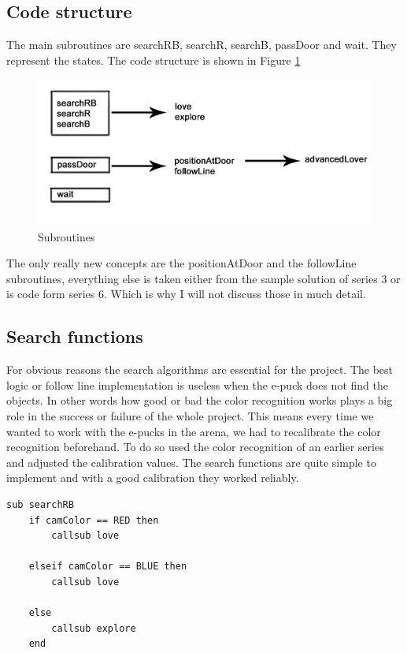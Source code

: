 \documentclass[12pt,a4paper]{article}
\begin{document}
\subsection{Code structure}
The main subroutines are searchRB, searchR, searchB, passDoor and wait. They represent the states. The code structure is shown in Figure \ref{fig:Subroutines}
\begin{figure}[h!]
\begin{center}
\includegraphics[scale=3]{images/SubroutinesOverview.png}
\caption{Subroutines}
\label{fig:Subroutines}	
\end{center}
\end{figure}
The only really new concepts are the positionAtDoor and the followLine subroutines, everything else is taken either from the sample solution of series 3 or is code form series 6. Which is why I will not discuss those in much detail. 

\subsection{Search functions}
For obvious reasons the search algorithms are essential for the project. The best logic or follow line implementation is useless when the e-puck does not find the objects. In other words how good or bad the color recognition works plays a big role in the success or failure of the whole project. This means every time we wanted to work with the e-pucks in the arena, we had to recalibrate the color recognition beforehand. To do so used the color recognition of an earlier series and adjusted the calibration values. The search functions are quite simple to implement and with a good calibration they worked reliably.
\begin{lstlisting}
sub searchRB
	if camColor == RED then
		callsub love

	elseif camColor == BLUE then
		callsub love
		
	else
		callsub explore
	end
\end{lstlisting}
\end{document}

